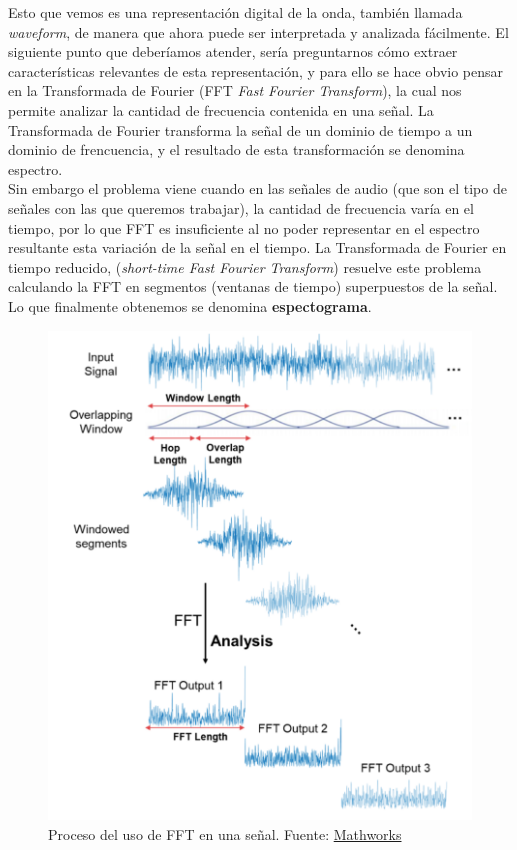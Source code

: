 \documentclass[11pt,a4paper,spanish]{book}
\begin{document}
	Esto que vemos es una representación digital de la onda, también llamada \emph{waveform}, de manera que ahora puede ser interpretada y analizada fácilmente.\hfill \break
	El siguiente punto que deberíamos atender, sería preguntarnos cómo extraer características relevantes de esta representación, y para ello se hace obvio pensar en la Transformada de Fourier (FFT \emph{Fast Fourier Transform}), la cual nos permite analizar la cantidad de frecuencia contenida en una señal. La Transformada de Fourier transforma la señal de un dominio de tiempo a un dominio de frencuencia, y el resultado de esta transformación se denomina espectro. \\
	Sin embargo el problema viene cuando en las señales de audio (que son el tipo de señales con las que queremos trabajar), la cantidad de frecuencia varía en el tiempo, por lo que FFT es insuficiente al no poder representar en el espectro resultante esta variación de la señal en el tiempo. La Transformada de Fourier en tiempo reducido, (\emph{short-time Fast Fourier Transform}) resuelve este problema calculando la FFT en segmentos (ventanas de tiempo) superpuestos de la señal. Lo que finalmente obtenemos se denomina \textbf{espectograma}.
	
	\newpage
	\begin{figure}[H]
		\centering
		\includegraphics[scale=0.25]{processFFT.png} 
		\caption{Proceso del uso de FFT en una señal. Fuente: \href{https://www.mathworks.com/help/dsp/ref/dsp.stft.html}{Mathworks}}
	\end{figure} 
	
\end{document}

